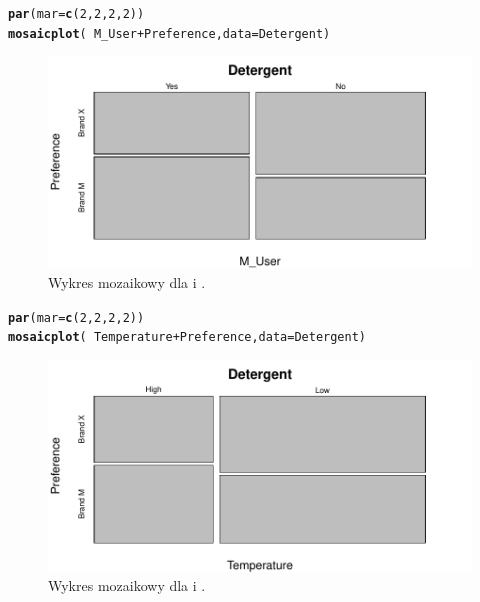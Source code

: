 \documentclass[12pt]{mwart}\usepackage[]{graphicx}\usepackage[]{color}
\makeatletter
\def\maxwidth{ %
  \ifdim\Gin@nat@width>\linewidth
    \linewidth
  \else
    \Gin@nat@width
  \fi
}
\newcommand{\hlnum}[1]{\textcolor[rgb]{0.686,0.059,0.569}{#1}}%
\newcommand{\hlopt}[1]{\textcolor[rgb]{0,0,0}{#1}}%
\newcommand{\hlstd}[1]{\textcolor[rgb]{0.345,0.345,0.345}{#1}}%
\newcommand{\hlkwc}[1]{\textcolor[rgb]{0.333,0.667,0.333}{#1}}%
\newcommand{\hlkwd}[1]{\textcolor[rgb]{0.737,0.353,0.396}{\textbf{#1}}}%
\newenvironment{kframe}{%
 \def\at@end@of@kframe{}%
 \ifinner\ifhmode%
  \def\at@end@of@kframe{\end{minipage}}%
  \begin{minipage}{\columnwidth}%
 \fi\fi%
 \def\FrameCommand##1{\hskip\@totalleftmargin \hskip-\fboxsep
 \colorbox{shadecolor}{##1}\hskip-\fboxsep
     \hskip-\linewidth \hskip-\@totalleftmargin \hskip\columnwidth}%
 \MakeFramed {\advance\hsize-\width
   \@totalleftmargin\z@ \linewidth\hsize
   \@setminipage}}%
 {\par\unskip\endMakeFramed%
 \at@end@of@kframe}
\newenvironment{knitrout}{}{} %
\makeatother
\begin{document}
\begin{knitrout}
\color{fgcolor}\begin{kframe}
\begin{alltt}
\hlkwd{par}\hlstd{(}\hlkwc{mar} \hlstd{=} \hlkwd{c}\hlstd{(}\hlnum{2}\hlstd{,} \hlnum{2}\hlstd{,} \hlnum{2}\hlstd{,} \hlnum{2}\hlstd{))}
\hlkwd{mosaicplot}\hlstd{(}\hlopt{~}\hlstd{M_User}\hlopt{+}\hlstd{Preference,} \hlkwc{data} \hlstd{= Detergent)}
\end{alltt}
\end{kframe}\begin{figure}[H]
\includegraphics[width=\maxwidth]{figure/fig_4-1} \caption{\label{fig:4}Wykres mozaikowy dla  i .}\label{fig:fig_4}
\end{figure}

\end{knitrout}
\begin{knitrout}
\color{fgcolor}\begin{kframe}
\begin{alltt}
\hlkwd{par}\hlstd{(}\hlkwc{mar} \hlstd{=} \hlkwd{c}\hlstd{(}\hlnum{2}\hlstd{,} \hlnum{2}\hlstd{,} \hlnum{2}\hlstd{,} \hlnum{2}\hlstd{))}
\hlkwd{mosaicplot}\hlstd{(}\hlopt{~}\hlstd{Temperature}\hlopt{+}\hlstd{Preference,} \hlkwc{data} \hlstd{= Detergent)}
\end{alltt}
\end{kframe}\begin{figure}[H]
\includegraphics[width=\maxwidth]{figure/fig_5-1} \caption{\label{fig:5}Wykres mozaikowy dla  i .}\label{fig:fig_5}
\end{figure}

\end{knitrout}
\end{document}
